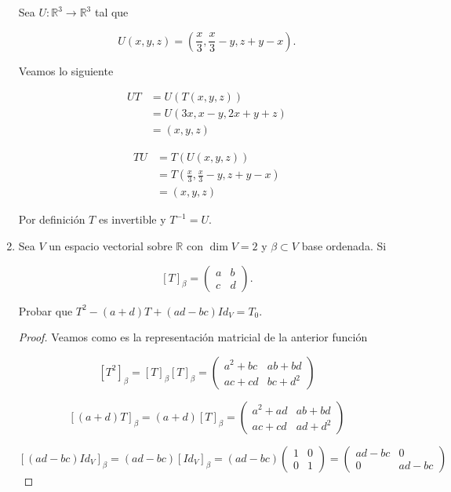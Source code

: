 \documentclass[letterpaper]{article}
\theoremstyle{definition}
\theoremstyle{lemathm}
\theoremstyle{lemademthm}
\newcommand{\R}{\mathbb{R}}
\begin{document}
\begin{enumerate}
		Sea $U : \R^3 \rightarrow \R^3$ tal que
		
		\[U(x,y,z) = \left(\frac{x}{3}, \frac{x}{3} - y, z + y - x\right).\]

		Veamos lo siguiente

		\begin{align*}
			UT &= U(T(x,y,z))\\
			&= U(3x, x-y, 2x+y+z)\\
			&= (x,y,z)
		\end{align*}

		\begin{align*}
			TU&=T(U(x,y,z))\\
			&= T\left(\frac{x}{3}, \frac{x}{3} - y, z + y - x\right)\\
			&=(x,y,z)
		\end{align*}

		Por definición $T$ es invertible y $T^{-1} = U$.

		\newpage

		\item Sea $V$ un espacio vectorial sobre $\R$ con $\dim V = 2$ y $\beta \subset V$ base ordenada. Si
		
		\[[T]_\beta = \begin{pmatrix}
			a & b\\
			c & d
		\end{pmatrix}.\]

		Probar que $T^2 - (a+d)T + (ad-bc)Id_V = T_0$.

		\begin{proof}

			Veamos como es la representación matricial de la anterior función

			\[[T^2]_\beta = [T]_\beta[T]_\beta = \begin{pmatrix}
				a^2 + bc & ab + bd\\
				ac + cd & bc + d^2
			\end{pmatrix}\]

			\[[(a+d)T]_\beta = (a+d)[T]_\beta = \begin{pmatrix}
				a^2 + ad & ab + bd\\
				ac + cd & ad + d^2
			\end{pmatrix}\]

			\[[(ad - bc)Id_V]_\beta = (ad-bc)[Id_V]_\beta = (ad-bc)\begin{pmatrix}
				1 & 0\\
				0 & 1
			\end{pmatrix} = \begin{pmatrix}
				ad - bc & 0\\
				0 & ad - bc
			\end{pmatrix}\]
			

\end{proof}
\end{enumerate}
\end{document}
